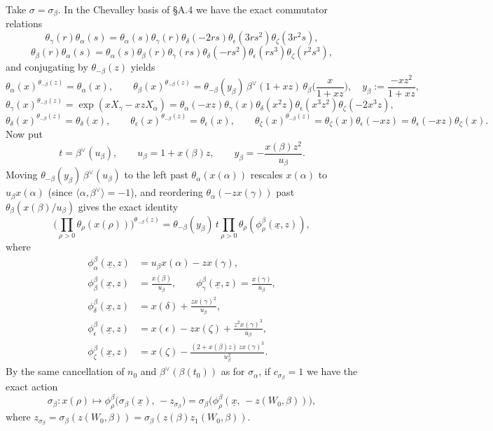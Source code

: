 \documentclass[12pt,letterpaper]{amsart}
\theoremstyle{plain}
\theoremstyle{definition}
\theoremstyle{remark}
\theoremstyle{definition}
\newcommand{\eps}{\epsilon}
\newcommand{\unx}{\underline{x}}
\begin{document}
Take $\sigma =\sigma_\beta$. In the Chevalley basis of \S A.4 we have the exact
commutator relations
\[
\theta_\gamma(r)\theta_\alpha (s)=\theta_\alpha (s)\theta_\gamma(r)
\theta_\delta(-2rs)\theta_\epsilon(3rs^2)\theta_\zeta(3r^2s),
\]
\[
\theta_\beta(r)\theta_\alpha (s)=\theta_\alpha (s)\theta_\beta(r)
\theta_\gamma(rs)
\theta_\delta(-rs^2)\theta_\epsilon(rs^3)\theta_\zeta(r^2s^3),
\]
and conjugating by $\theta_{-\beta}(z)$ yields
\[
\theta_\alpha(x)^{\theta_{-\beta}(z)}=\theta_\alpha(x),\qquad
\theta_\beta(x)^{\theta_{-\beta}(z)}=
\theta_{-\beta}(y_\beta)\,
\beta^\vee(1+xz)\,\theta_\beta\Big(\frac{x}{1+xz}\Big),\quad
y_\beta:=\frac{-xz^2}{1+xz},
\]
\[
\theta_\gamma(x)^{\theta_{-\beta}(z)}
=\exp(xX_\gamma-xzX_\alpha)
=\theta_\alpha(-xz)\theta_\gamma(x)\theta_\delta(x^2z)
\theta_\epsilon(x^3z^2)\theta_\zeta(-2x^3z),
\]
\[
\theta_\delta(x)^{\theta_{-\beta}(z)}=\theta_\delta(x),\qquad
\theta_\epsilon(x)^{\theta_{-\beta}(z)}=\theta_\epsilon(x),\qquad
\theta_\zeta(x)^{\theta_{-\beta}(z)}=\theta_\zeta(x)\theta_\epsilon(-xz)
=\theta_\epsilon(-xz)\theta_\zeta(x).
\]
Now put
\[
t = \beta^\vee(u_\beta),\qquad u_\beta = 1+x(\beta)z,\qquad
y_\beta = -\frac{x(\beta)z^2}{u_\beta}.
\]
Moving $\theta_{-\beta}(y_\beta)\,\beta^\vee(u_\beta)$
to the left past $\theta_\alpha(x(\alpha))$ rescales $x(\alpha)$ to
$u_\beta x(\alpha)$ (since $\langle\alpha,\beta^\vee\rangle=-1$), and reordering
$\theta_\alpha(-zx(\gamma))$ past $\theta_\beta(x(\beta)/u_\beta)$ gives the
exact identity
\begin{equation}\tag{2.13}\label{eq:2.13}
\Big(\prod_{\rho >0}\theta_\rho(x(\rho))\Big)^{\theta_{-\beta}(z)}
=\theta_{-\beta}(y_\beta)\,t\prod_{\rho >0}\theta_\rho(\phi_\rho^\beta(\unx,z)),
\end{equation}
where
\[
\begin{split}
\phi_\alpha^\beta(\unx,z)
&=u_\beta x(\alpha)-zx(\gamma),\\
\phi_\beta^\beta(\unx,z)
&=\frac{x(\beta)}{u_\beta},\qquad
\phi_\gamma^\beta(\unx,z)
=\frac{x(\gamma)}{u_\beta},\\
\phi_\delta^\beta(\unx,z)
&=x(\delta)+\frac{zx(\gamma)^2}{u_\beta},\\
\phi_{\eps}^\beta(\unx,z)
&=x(\eps)-zx(\zeta)+\frac{z^2x(\gamma)^3}{u_\beta},\\
\phi_\zeta^\beta(\unx,z)
&=x(\zeta)-\frac{(2+x(\beta)z)\,zx(\gamma)^3}{u_\beta^2}.
\end{split}
\]
By the same cancellation of $n_0$ and $\beta^\vee(\beta(t_0))$ as for
$\sigma_\alpha$, if $c_{\sigma_\beta}=1$ we have the exact action
\begin{equation}\tag{2.14}\label{eq:2.14}
\sigma_\beta :x(\rho)\longmapsto
\phi_\rho^\beta\big(\sigma_\beta(\unx),\,-z_{\sigma_\beta}\big)
=\sigma_\beta\big(\phi_\rho^\beta(\unx,\,-z(W_0,\beta))\big),
\end{equation}
where $z_{\sigma_\beta}=\sigma_\beta(z(W_0,\beta))=\sigma_\beta(z(\beta)z_1(W_0,\beta))$.
\end{document}
